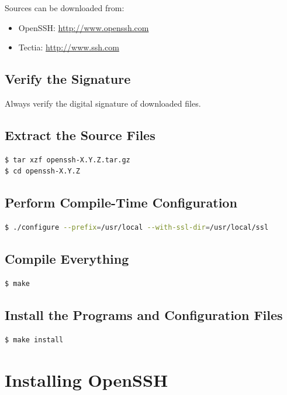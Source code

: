 \documentclass[12pt]{book}
\begin{document}
Sources can be downloaded from:
\begin{itemize}
    \item OpenSSH: \url{http://www.openssh.com}
    \item Tectia: \url{http://www.ssh.com}
\end{itemize}

\subsection{Verify the Signature}

Always verify the digital signature of downloaded files.

\subsection{Extract the Source Files}

\begin{lstlisting}[language=bash]
$ tar xzf openssh-X.Y.Z.tar.gz
$ cd openssh-X.Y.Z
\end{lstlisting}

\subsection{Perform Compile-Time Configuration}

\begin{lstlisting}[language=bash]
$ ./configure --prefix=/usr/local --with-ssl-dir=/usr/local/ssl
\end{lstlisting}

\subsection{Compile Everything}

\begin{lstlisting}[language=bash]
$ make
\end{lstlisting}

\subsection{Install the Programs and Configuration Files}

\begin{lstlisting}[language=bash]
$ make install
\end{lstlisting}

\section{Installing OpenSSH}
\end{document}
